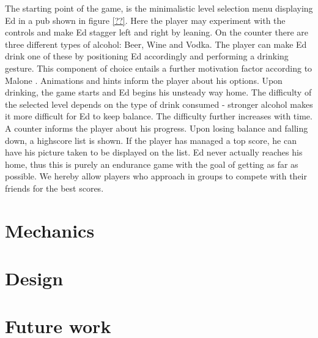 \documentclass{chi-ext}
\begin{document}
The starting point of the game, is the minimalistic level selection menu displaying Ed in a pub shown in figure \ref{??}. Here the player may experiment with the controls and make Ed stagger left and right by leaning. On the counter there are three different types of alcohol: Beer, Wine and Vodka. The player can make Ed drink one of these by positioning Ed accordingly and performing a drinking gesture. This component of choice entails a further motivation factor according to Malone \cite{malone1981motivation}. Animations and hints inform the player about his options. Upon drinking, the game starts and Ed begins his unsteady way home. The difficulty of the selected level depends on the type of drink consumed - stronger alcohol makes it more difficult for Ed to keep balance. The difficulty further increases with time. A counter informs the player about his progress. Upon losing balance and falling down, a highscore list is shown. If the player has managed a top score, he can have his picture taken to be displayed on the list. Ed never actually reaches his home, thus this is purely an endurance game with the goal of getting as far as possible. We hereby allow players who approach in groups to compete with their friends for the best scores. \cite{ohara2008understanding}


%

\section{Mechanics}


\section{Design}


\section{Future work}

\end{document}
